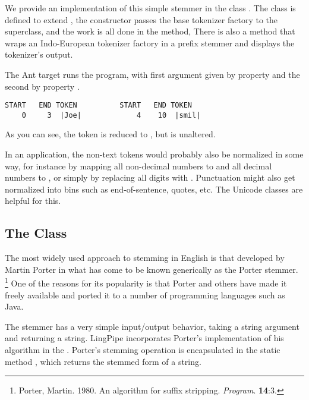 We provide an implementation of this simple stemmer in the class
.  The class is defined to extend
, the constructor passes the
base tokenizer factory to the superclass, and the work is all
done in the  method,
%
%
There is also a  method that wraps an Indo-European
tokenizer factory in a prefix stemmer and displays the tokenizer's
output.

The Ant target  runs the program, 
with first argument given by property  and
the second by property .
%
\begin{verbatim}
START   END TOKEN          START   END TOKEN
    0     3  |Joe|             4    10  |smil|
\end{verbatim}
%
As you can see, the token  is reduced to
, but  is unaltered.  

In an application, the non-text tokens would probably also be
normalized in some way, for instance by mapping all non-decimal
numbers to  and all decimal numbers to
, or simply by replacing all digits with
.  Punctuation might also get normalized into
bins such as end-of-sentence, quotes, etc.  The Unicode classes
are helpful for this.


\subsection{The  Class}\label{section:tok-porter-stemmer}

The most widely used approach to stemming in English is
that developed by Martin Porter in what has come to be known
generically as the Porter stemmer.%
%
\footnote{Porter, Martin. 1980. An algorithm for suffix
stripping. {\it Program}. {\bf 14}:3.}
%
One of the reasons for its popularity is that Porter and others
have made it freely available and ported it to a number of
programming languages such as Java.  

The stemmer has a very simple input/output behavior, taking a string
argument and returning a string.  LingPipe incorporates Porter's
implementation of his algorithm in the
.  Porter's stemming operation
is encapsulated in the static method , which returns
the stemmed form of a string.

